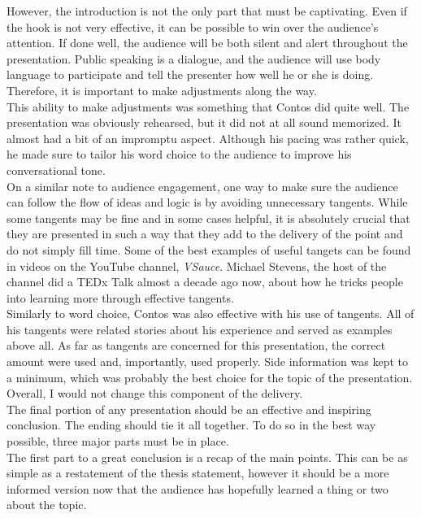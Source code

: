 \documentclass[]{mla}
\begin{document}
    However, the introduction is not the only part that must be captivating. Even if the hook is not very effective, it can be possible to win over the audience's attention. If done well, the audience will be both silent and alert throughout the presentation. Public speaking is a dialogue, and the audience will use body language to participate and tell the presenter how well he or she is doing. Therefore, it is important to make adjustments along the way.
    \\
    This ability to make adjustments was something that Contos did quite well. The presentation was obviously rehearsed, but it did not at all sound memorized. It almost had a bit of an impromptu aspect. Although his pacing was rather quick, he made sure to tailor his word choice to the audience to improve his conversational tone.
    \\
    On a similar note to audience engagement, one way to make sure the audience can follow the flow of ideas and logic is by avoiding unnecessary tangents. While some tangents may be fine and in some cases helpful, it is absolutely crucial that they are presented in such a way that they add to the delivery of the point and do not simply fill time. Some of the best examples of useful tangets can be found in videos on the YouTube channel, \textit{VSauce}. Michael Stevens, the host of the channel did a TEDx Talk almost a decade ago now, about how he tricks people into learning more through effective tangents.
    \\
    Similarly to word choice, Contos was also effective with his use of tangents. All of his tangents were related stories about his experience and served as examples above all. As far as tangents are concerned for this presentation, the correct amount were used and, importantly, used properly. Side information was kept to a minimum, which was probably the best choice for the topic of the presentation. Overall, I would not change this component of the delivery.
    \\
    The final portion of any presentation should be an effective and inspiring conclusion. The ending should tie it all together. To do so in the best way possible, three major parts must be in place.
    \\
    The first part to a great conclusion is a recap of the main points. This can be as simple as a restatement of the thesis statement, however it should be a more informed version now that the audience has hopefully learned a thing or two about the topic.
    \\
\end{document}

